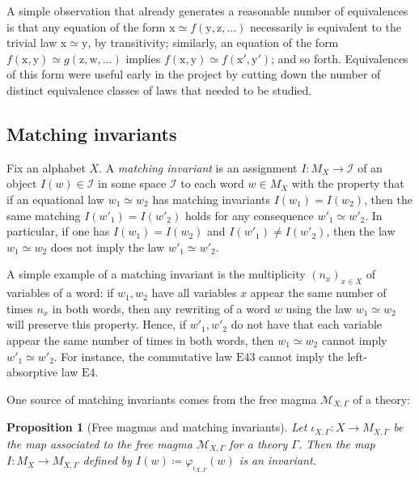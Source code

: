 \documentclass[12pt]{amsart}
\newtheorem{proposition}[theorem]{Proposition}
\theoremstyle{definition}
\newcommand{\x}{\mathrm{x}}
\newcommand{\y}{\mathrm{y}}
\newcommand{\z}{\mathrm{z}}
\newcommand{\w}{\mathrm{w}}
\newcommand{\formaleq}{\simeq}
\newcommand{\Magma}{{\mathcal{M}}}
\newcommand{\Eq}[1]{\mathrm{E}#1}
\begin{document}
A simple observation that already generates a reasonable number of equivalences is that any equation of the form $\x \formaleq f(\y,\z,\dots)$ necessarily is equivalent to the trivial law $\x \formaleq \y$, by transitivity; similarly, an equation of the form $f(\x,\y) \formaleq g(\z,\w,\dots)$ implies $f(\x,\y) \formaleq f(\x',\y')$; and so forth.  Equivalences of this form were useful early in the project by cutting down the number of distinct equivalence classes of laws that needed to be studied.

\subsection{Matching invariants}

Fix an alphabet $X$. A \emph{matching invariant} is an assignment $I \colon M_X \to {\mathcal I}$ of an object $I(w) \in {\mathcal I}$ in some space ${\mathcal I}$ to each word $w \in M_X$ with the property that if an equational law $w_1 \formaleq w_2$ has matching invariants $I(w_1)=I(w_2)$, then the same matching $I(w'_1) = I(w'_2)$ holds for any consequence $w'_1 \formaleq w'_2$.  In particular, if one has $I(w_1)=I(w_2)$ and $I(w'_1) \neq I(w'_2)$, then the law $w_1 \formaleq w_2$ does not imply the law $w'_1 \formaleq w'_2$.

A simple example of a matching invariant is the multiplicity $(n_x)_{x \in X}$ of variables of a word: if $w_1,w_2$ have all variables $x$ appear the same number of times $n_x$ in both words, then any rewriting of a word $w$ using the law $w_1 \formaleq w_2$ will preserve this property.  Hence, if $w'_1, w'_2$ do not have that each variable appear the same number of times in both words, then $w_1 \formaleq w_2$ cannot imply $w'_1 \formaleq w'_2$.  For instance, the commutative law $\Eq{43}$ cannot imply the left-absorptive law $\Eq{4}$.

One source of matching invariants comes from the free magma $\Magma_{X,\Gamma}$ of a theory:

\begin{proposition}[Free magmas and matching invariants]\label{free-inv}  Let $\iota_{X,\Gamma} \colon X \to M_{X,\Gamma}$ be the map associated to the free magma $\Magma_{X,\Gamma}$ for a theory $\Gamma$.  Then the map $I \colon M_X \to M_{X,\Gamma}$ defined by $I(w) \coloneqq \varphi_{\iota_{X,\Gamma}}(w)$ is an invariant.
\end{proposition}
\end{document}
